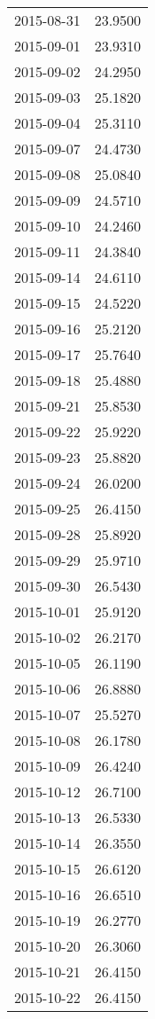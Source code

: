 \begin{tabular}{lr}
2015-08-31 &     23.9500 \\
2015-09-01 &     23.9310 \\
2015-09-02 &     24.2950 \\
2015-09-03 &     25.1820 \\
2015-09-04 &     25.3110 \\
2015-09-07 &     24.4730 \\
2015-09-08 &     25.0840 \\
2015-09-09 &     24.5710 \\
2015-09-10 &     24.2460 \\
2015-09-11 &     24.3840 \\
2015-09-14 &     24.6110 \\
2015-09-15 &     24.5220 \\
2015-09-16 &     25.2120 \\
2015-09-17 &     25.7640 \\
2015-09-18 &     25.4880 \\
2015-09-21 &     25.8530 \\
2015-09-22 &     25.9220 \\
2015-09-23 &     25.8820 \\
2015-09-24 &     26.0200 \\
2015-09-25 &     26.4150 \\
2015-09-28 &     25.8920 \\
2015-09-29 &     25.9710 \\
2015-09-30 &     26.5430 \\
2015-10-01 &     25.9120 \\
2015-10-02 &     26.2170 \\
2015-10-05 &     26.1190 \\
2015-10-06 &     26.8880 \\
2015-10-07 &     25.5270 \\
2015-10-08 &     26.1780 \\
2015-10-09 &     26.4240 \\
2015-10-12 &     26.7100 \\
2015-10-13 &     26.5330 \\
2015-10-14 &     26.3550 \\
2015-10-15 &     26.6120 \\
2015-10-16 &     26.6510 \\
2015-10-19 &     26.2770 \\
2015-10-20 &     26.3060 \\
2015-10-21 &     26.4150 \\
2015-10-22 &     26.4150 \\

\end{tabular}
